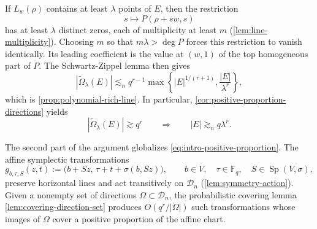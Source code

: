 \documentclass[11pt,letterpaper]{amsart}
\numberwithin{equation}{section}
\theoremstyle{definition}
\theoremstyle{remark}
\newcommand{\Fq}{\mathbb F_q}
\newcommand{\Dn}{\mathcal D_n}
\newcommand{\Sp}{\operatorname{Sp}}
\begin{document}
If $L_w(\rho)$ contains at least $\lambda$ points of $E$, then the
restriction
\[
 s\longmapsto P(\rho+sw,s)
\]
has at least $\lambda$ distinct zeros, each of multiplicity at least
$m$ (\cref{lem:line-multiplicity}). Choosing $m$ so that
$m\lambda>\deg P$ forces this restriction to vanish identically. Its
leading coefficient is the value at $(w,1)$ of the top homogeneous
part of $P$. The Schwartz-Zippel lemma then gives
\begin{equation}\label{eq:intro-polynomial-estimate}
 |\widetilde\Omega_\lambda(E)|
 \lesssim_n
 q^{r-1}
 \max\left\{
 |E|^{1/(r+1)},
 \frac{|E|}{\lambda^r}
 \right\},
\end{equation}
which is \cref{prop:polynomial-rich-line}.  In particular,
\cref{cor:positive-proportion-directions} yields
\begin{equation}\label{eq:intro-positive-proportion}
 |\widetilde\Omega_\lambda(E)|
 \gtrsim q^r
 \qquad\Longrightarrow\qquad
 |E|\gtrsim_n q\lambda^r.
\end{equation}

The second part of the argument globalizes
\eqref{eq:intro-positive-proportion}.  The affine symplectic
transformations
\[
 g_{b,\tau,S}(z,t)
 :=
 \bigl(
 b+Sz,\,
 \tau+t+\sigma(b,Sz)
 \bigr),
 \qquad
 b\in V,\quad
 \tau\in\Fq,\quad
 S\in\Sp(V,\sigma),
\]
preserve horizontal lines and act transitively on $\Dn$ (\cref{lem:symmetry-action}). Given a nonempty set of directions
$\Omega\subset\Dn$, the probabilistic covering lemma
\cref{lem:covering-direction-set} produces $O(q^r/|\Omega|)$ such transformations whose images of $\Omega$ cover
a positive proportion of the affine chart.
\end{document}

